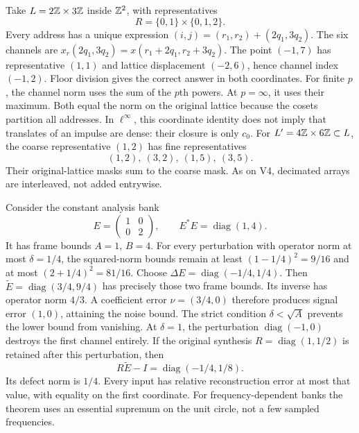Take $L=2\mathbb Z\times3\mathbb Z$ inside $\mathbb Z^2$, with representatives
\[
R=\{0,1\}\times\{0,1,2\}.
\]
Every address has a unique expression $(i,j)=(r_1,r_2)+(2q_1,3q_2)$. The six channels are $x_r(2q_1,3q_2)=x(r_1+2q_1,r_2+3q_2)$.
The point $(-1,7)$ has representative $(1,1)$ and lattice displacement $(-2,6)$, hence channel index $(-1,2)$. Floor division gives the correct answer in both coordinates.
For finite $p$, the channel norm uses the sum of the $p$th powers. At $p=\infty$, it uses their maximum. Both equal the norm on the original lattice because the cosets partition all addresses. In $\ell^\infty$, this coordinate identity does not imply that translates of an impulse are dense: their closure is only $c_0$.
For $L'=4\mathbb Z\times6\mathbb Z\subset L$, the coarse representative $(1,2)$ has fine representatives
\[
(1,2),\ (3,2),\ (1,5),\ (3,5).
\]
Their original-lattice masks sum to the coarse mask. As on V4, decimated arrays are interleaved, not added entrywise.

Consider the constant analysis bank
\[
E=\begin{pmatrix}1&0\\0&2\end{pmatrix},\qquad
E^*E=\operatorname{diag}(1,4).
\]
It has frame bounds $A=1$, $B=4$. For every perturbation with operator norm at most $\delta=1/4$, the squared-norm bounds remain at least $(1-1/4)^2=9/16$ and at most $(2+1/4)^2=81/16$.
Choose $\Delta E=\operatorname{diag}(-1/4,1/4)$. Then $\widetilde E=\operatorname{diag}(3/4,9/4)$ has precisely those two frame bounds. Its inverse has operator norm $4/3$. A coefficient error $\nu=(3/4,0)$ therefore produces signal error $(1,0)$, attaining the noise bound.
The strict condition $\delta<\sqrt A$ prevents the lower bound from vanishing. At $\delta=1$, the perturbation $\operatorname{diag}(-1,0)$ destroys the first channel entirely.
If the original synthesis $R=\operatorname{diag}(1,1/2)$ is retained after this perturbation, then
\[
R\widetilde E-I=\operatorname{diag}(-1/4,1/8).
\]
Its defect norm is $1/4$. Every input has relative reconstruction error at most that value, with equality on the first coordinate. For frequency-dependent banks the theorem uses an essential supremum on the unit circle, not a few sampled frequencies.

